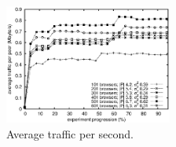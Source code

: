 

\ \\

\begin{figure}
  \centering
  \includegraphics[width=0.49\textwidth]{img/traffic.eps}
  \caption{\label{fig:traffic}Average traffic per second.}
\end{figure}

